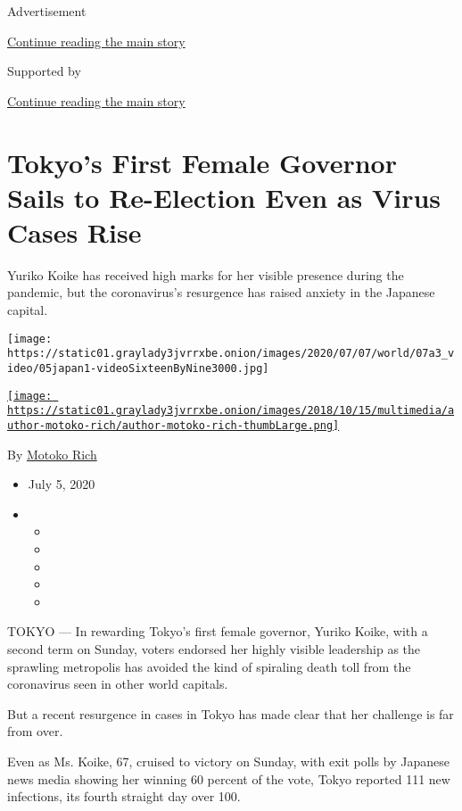 Advertisement

\protect\hyperlink{after-top}{Continue reading the main story}

Supported by

\protect\hyperlink{after-sponsor}{Continue reading the main story}

\hypertarget{tokyos-first-female-governor-sails-to-re-election-even-as-virus-cases-rise}{%
\section{Tokyo's First Female Governor Sails to Re-Election Even as
Virus Cases
Rise}\label{tokyos-first-female-governor-sails-to-re-election-even-as-virus-cases-rise}}

Yuriko Koike has received high marks for her visible presence during the
pandemic, but the coronavirus's resurgence has raised anxiety in the
Japanese capital.

\texttt{[image: https://static01.graylady3jvrrxbe.onion/images/2020/07/07/world/07a3\_video/05japan1-videoSixteenByNine3000.jpg]}

\href{https://www.nytimes3xbfgragh.onion/by/motoko-rich}{\texttt{[image: https://static01.graylady3jvrrxbe.onion/images/2018/10/15/multimedia/author-motoko-rich/author-motoko-rich-thumbLarge.png]}}

By \href{https://www.nytimes3xbfgragh.onion/by/motoko-rich}{Motoko Rich}

\begin{itemize}
\item
  July 5, 2020
\item
  \begin{itemize}
  \item
  \item
  \item
  \item
  \item
  \end{itemize}
\end{itemize}

TOKYO --- In rewarding Tokyo's first female governor, Yuriko Koike, with
a second term on Sunday, voters endorsed her highly visible leadership
as the sprawling metropolis has avoided the kind of spiraling death toll
from the coronavirus seen in other world capitals.

But a recent resurgence in cases in Tokyo has made clear that her
challenge is far from over.

Even as Ms. Koike, 67, cruised to victory on Sunday, with exit polls by
Japanese news media showing her winning 60 percent of the vote, Tokyo
reported 111 new infections, its fourth straight day over 100.


